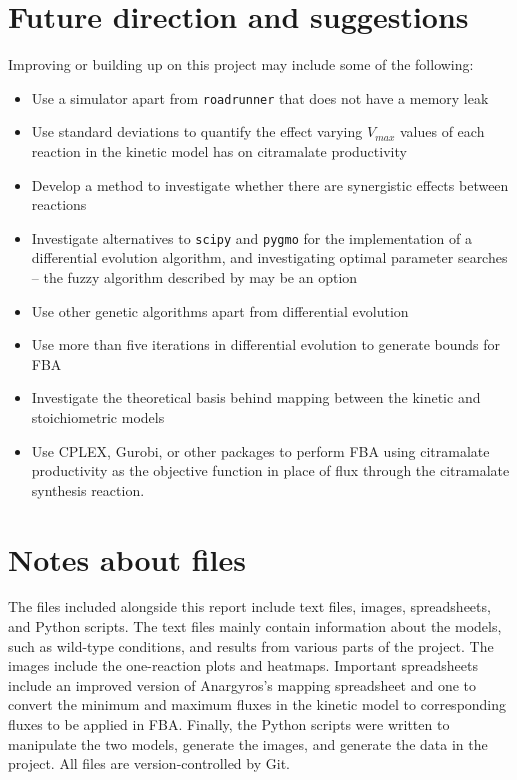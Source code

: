 \documentclass[parskip=full, numbers=noenddot]{scrreprt}
\begin{document}
\section{Future direction and suggestions}
\label{sec:future}

Improving or building up on this project may include some of the following:

\begin{itemize}
\item Use a simulator apart from \texttt{roadrunner} that does not have a memory leak
\item Use standard deviations to quantify the effect varying $V_{max}$ values of each reaction in the kinetic model has on citramalate productivity
\item Develop a method to investigate whether there are synergistic effects between reactions
\item Investigate alternatives to \texttt{scipy} and \texttt{pygmo} for the implementation of a differential evolution algorithm, and investigating optimal parameter searches -- the fuzzy algorithm described by \citet{liu_fuzzy_2005} may be an option
\item Use other genetic algorithms apart from differential evolution
\item Use more than five iterations in differential evolution to generate bounds for FBA
\item Investigate the theoretical basis behind mapping between the kinetic and stoichiometric models
  \item Use CPLEX, Gurobi, or other packages to perform FBA using citramalate productivity as the objective function in place of flux through the citramalate synthesis reaction.
\end{itemize}
  
\section{Notes about files}
\label{sec:files}

The files included alongside this report include text files, images, spreadsheets, and Python scripts. The text files mainly contain information about the models, such as wild-type conditions, and results from various parts of the project. The images include the one-reaction plots and heatmaps. Important spreadsheets include an improved version of Anargyros's mapping spreadsheet and one to convert the minimum and maximum fluxes in the kinetic model to corresponding fluxes to be applied in FBA. Finally, the Python scripts were written to manipulate the two models, generate the images, and generate the data in the project. All files are version-controlled by Git.
\end{document}

